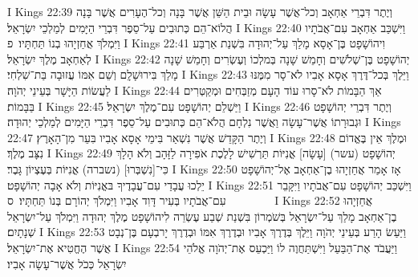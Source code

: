 I Kings 22:39	וְיֶתֶר דִּבְרֵי אַחְאָב וְכל־אֲשֶׁר עָשָׂה וּבֵית הַשֵּׁן אֲשֶׁר בָּנָה וְכל־הֶעָרִים אֲשֶׁר בָּנָה הֲלוֹא־הֵם כְּתוּבִים עַל־סֵפֶר דִּבְרֵי הַיָּמִים לְמַלְכֵי יִשְׂרָאֵל׃
I Kings 22:40	וַיִּשְׁכַּב אַחְאָב עִם־אֲבֹתָיו וַיִּמְלֹךְ אֲחַזְיָהוּ בְנוֹ תַּחְתָּיו׃ {פ}
I Kings 22:41	וִיהוֹשָׁפָט בֶּן־אָסָא מָלַךְ עַל־יְהוּדָה בִּשְׁנַת אַרְבַּע לְאַחְאָב מֶלֶךְ יִשְׂרָאֵל׃
I Kings 22:42	יְהוֹשָׁפָט בֶּן־שְׁלֹשִׁים וְחָמֵשׁ שָׁנָה בְּמלְכוֹ וְעֶשְׂרִים וְחָמֵשׁ שָׁנָה מָלַךְ בִּירוּשָׁלָ͏ִם וְשֵׁם אִמּוֹ עֲזוּבָה בַּת־שִׁלְחִי׃
I Kings 22:43	וַיֵּלֶךְ בְּכל־דֶּרֶךְ אָסָא אָבִיו לֹא־סָר מִמֶּנּוּ לַעֲשׂוֹת הַיָּשָׁר בְּעֵינֵי יְהֹוָה׃
I Kings 22:44	אַךְ הַבָּמוֹת לֹא־סָרוּ עוֹד הָעָם מְזַבְּחִים וּמְקַטְּרִים בַּבָּמוֹת׃
I Kings 22:45	וַיַּשְׁלֵם יְהוֹשָׁפָט עִם־מֶלֶךְ יִשְׂרָאֵל׃
I Kings 22:46	וְיֶתֶר דִּבְרֵי יְהוֹשָׁפָט וּגְבוּרָתוֹ אֲשֶׁר־עָשָׂה וַאֲשֶׁר נִלְחָם הֲלֹא־הֵם כְּתוּבִים עַל־סֵפֶר דִּבְרֵי הַיָּמִים לְמַלְכֵי יְהוּדָה׃
I Kings 22:47	וְיֶתֶר הַקָּדֵשׁ אֲשֶׁר נִשְׁאַר בִּימֵי אָסָא אָבִיו בִּעֵר מִן־הָאָרֶץ׃
I Kings 22:48	וּמֶלֶךְ אֵין בֶּאֱדוֹם נִצָּב מֶלֶךְ׃
I Kings 22:49	יְהוֹשָׁפָט (עשר) [עָשָׂה] אֳנִיּוֹת תַּרְשִׁישׁ לָלֶכֶת אֹפִירָה לַזָּהָב וְלֹא הָלָךְ כִּי־[נִשְׁבְּרוּ] (נשברה) אֳנִיּוֹת בְּעֶצְיוֹן גָּבֶר׃
I Kings 22:50	אָז אָמַר אֲחַזְיָהוּ בֶן־אַחְאָב אֶל־יְהוֹשָׁפָט יֵלְכוּ עֲבָדַי עִם־עֲבָדֶיךָ בּאֳנִיּוֹת וְלֹא אָבָה יְהוֹשָׁפָט׃
I Kings 22:51	וַיִּשְׁכַּב יְהוֹשָׁפָט עִם־אֲבֹתָיו וַיִּקָּבֵר עִם־אֲבֹתָיו בְּעִיר דָּוִד אָבִיו וַיִּמְלֹךְ יְהוֹרָם בְּנוֹ תַּחְתָּיו׃ {ס}        
I Kings 22:52	אֲחַזְיָהוּ בֶן־אַחְאָב מָלַךְ עַל־יִשְׂרָאֵל בְּשֹׁמְרוֹן בִּשְׁנַת שְׁבַע עֶשְׂרֵה לִיהוֹשָׁפָט מֶלֶךְ יְהוּדָה וַיִּמְלֹךְ עַל־יִשְׂרָאֵל שְׁנָתָיִם׃
I Kings 22:53	וַיַּעַשׂ הָרַע בְּעֵינֵי יְהֹוָה וַיֵּלֶךְ בְּדֶרֶךְ אָבִיו וּבְדֶרֶךְ אִמּוֹ וּבְדֶרֶךְ יָרבְעָם בֶּן־נְבָט אֲשֶׁר הֶחֱטִיא אֶת־יִשְׂרָאֵל׃
I Kings 22:54	וַיַּעֲבֹד אֶת־הַבַּעַל וַיִּשְׁתַּחֲוֶה לוֹ וַיַּכְעֵס אֶת־יְהֹוָה אֱלֹהֵי יִשְׂרָאֵל כְּכֹל אֲשֶׁר־עָשָׂה אָבִיו׃

